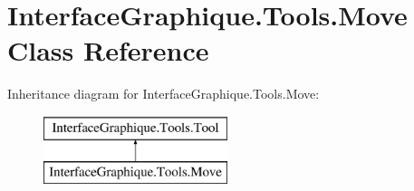 \hypertarget{class_interface_graphique_1_1_tools_1_1_move}{}\section{Interface\+Graphique.\+Tools.\+Move Class Reference}
\label{class_interface_graphique_1_1_tools_1_1_move}
Inheritance diagram for Interface\+Graphique.\+Tools.\+Move\+:\begin{figure}[H]
\begin{center}
\leavevmode
\includegraphics[height=2.000000cm]{class_interface_graphique_1_1_tools_1_1_move}
\end{center}
\end{figure}
